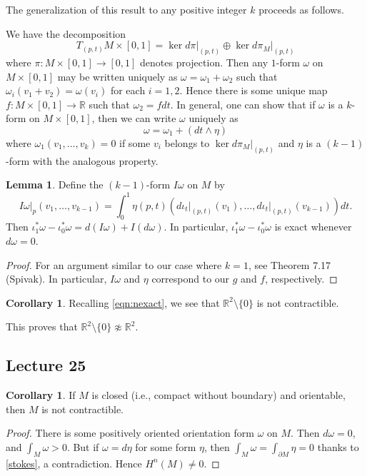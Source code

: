 \documentclass[10pt,letterpaper,cm]{nupset}
\theoremstyle{definition}
\theoremstyle{theorem}
\newtheorem{lemma}[definition]{Lemma}
\newtheorem{corollary}[definition]{Corollary}
\theoremstyle{remark}
\newcommand{\R}{\mathbb R}
\newcommand{\1}{\mathbf{1}}
\newcommand{\0}{\vec 0}
\begin{document}
\medskip


The generalization of this result to any positive integer $k$ proceeds as follows.

\medskip


We have the decomposition $$T_{(p,t)}M \times \left[0,1\right] = \ker d\pi\bigr\rvert_{(p,t)} \oplus \ker d\pi_M\bigr\rvert_{(p,t)}$$ where $\pi: M \times \left[0,1\right]\to \left[0,1\right]$ denotes projection. Then any $1$-form $\omega$ on $M \times \left[0,1\right]$ may be written uniquely as $\omega = \omega_1 + \omega_2$ such that $\omega_i(v_1 + v_2) = \omega(v_i)$ for each $i=1, 2$. Hence there is some unique map $f : M \times \left[0,1\right] \to \R$ such that $\omega_2 = f dt$. In general, one can show that if $\omega$ is a $k$-form on $M \times \left[0,1\right]$, then we can write $\omega$ uniquely as $$\omega = \omega_1 + (dt \wedge \eta)$$ where $\omega_1(v_1, \ldots, v_k) =0$ if some $v_i$ belongs to $\ker d\pi_M\bigr\rvert_{(p,t)}$ and $\eta$ is a $(k-1)$-form with the analogous property.
\begin{lemma}\label{exact}
Define the $(k-1)$-form $I\omega$ on $M$ by $$I \omega \bigr\rvert_p(v_1, \ldots, v_{k-1}) = \int_0^1 \eta(p, t)\left(d\iota_t\bigr\rvert_{(p,t)}(v_1), \ldots, d\iota_t\bigr\rvert_{(p,t)}(v_{k-1})\right)dt   .$$ Then $\iota^{\ast}_1\omega  - \iota^{\ast}_0 \omega = d(I\omega) + I(d\omega)$. In particular, $\iota^{\ast}_1\omega  - \iota^{\ast}_0 \omega$ is exact whenever $d\omega =0$.
\end{lemma}
\begin{proof}
For an argument similar to our  case where $k=1$,  see Theorem 7.17 (Spivak). In particular, $I\omega$ and $\eta$ correspond to our $g$ and $f$, respectively.
\end{proof} %


\smallskip

\begin{corollary}
Recalling \eqref{eqn:nexact}, we see that $\R^2\setminus \{0\}$ is not contractible.
\end{corollary}

This proves that $\R^2\setminus \{0\} \not\approx \R^2$.

\subsection{Lecture 25}

\begin{corollary}
If $M$ is closed (i.e., compact without boundary) and orientable, then $M$ is not contractible.
\end{corollary}
\begin{proof}
There is some positively oriented orientation form $\omega$ on $M$. Then $d\omega =0$, and $\int_M \omega >0$. But if $\omega = d \eta$ for some form $\eta$, then $\int_M \omega =  \int_{\partial{M}} \eta =0$ thanks to \cref{stokes}, a contradiction. Hence $H^n(M) \ne 0$.
\end{proof}
\end{document}
